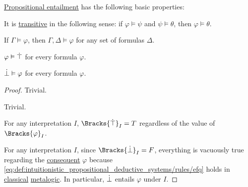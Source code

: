 \begin{proposition}\label{thm:def:propositional_entailment}
  \hyperref[def:propositional_entailment]{Propositional entailment} has the following basic properties:
  \begin{thmenum}
     It is \hyperref[def:binary_relation/transitive]{transitive} in the following sense: if \( \varphi \vDash \psi \) and \( \psi \vDash \theta \), then \( \varphi \vDash \theta \).

     If \( \Gamma \vDash \varphi \), then \( \Gamma, \Delta \vDash \varphi \) for any set of formulas \( \Delta \).

     \( \varphi \vDash \dot\top \) for every formula \( \varphi \).

     \( \dot\bot \vDash \varphi \) for every formula \( \varphi \).
  \end{thmenum}
\end{proposition}
\begin{proof}
   Trivial.

   Trivial.

   For any interpretation \( I \), \( \Bracks{\syntop}_I = T \) regardless of the value of \( \Bracks{\varphi}_I \).

   For any interpretation \( I \), since \( \Bracks{\synbot}_I = F \), everything is vacuously true regarding the \hyperref[def:conditional_formula/consequent]{consequent} \( \varphi \) because \eqref{eq:def:intuitionistic_propositional_deductive_systems/rules/efq} holds in \hyperref[rem:classical_logic]{classical} \hyperref[rem:metalogic]{metalogic}. In particular, \( \dot\bot \) entails \( \varphi \) under \( I \).
\end{proof}

